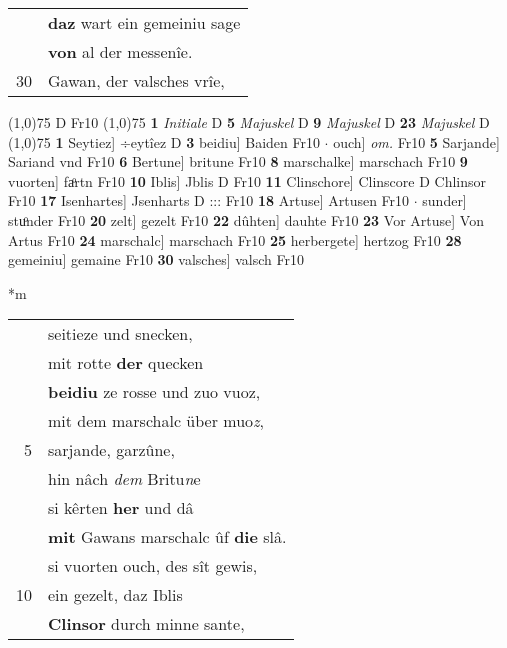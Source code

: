 \documentclass[8pt,a4paper,notitlepage]{article}
\begin{document}
\begin{table}[ht]
\begin{minipage}[t]{0.5\linewidth}
\begin{tabular}{rl}
 & \textbf{daz} wart ein gemeiniu sage\\ 
 & \textbf{von} al der messenîe.\\ 
30 & Gawan, der valsches vrîe,\\ 
\end{tabular}
\scriptsize
\line(1,0){75} \newline
D Fr10 \newline
\line(1,0){75} \newline
\textbf{1} \textit{Initiale} D  \textbf{5} \textit{Majuskel} D  \textbf{9} \textit{Majuskel} D  \textbf{23} \textit{Majuskel} D  \newline
\line(1,0){75} \newline
\textbf{1} Seytiez] ÷eytîez D \textbf{3} beidiu] Baiden Fr10  $\cdot$ ouch] \textit{om.} Fr10 \textbf{5} Sarjande] Sariand vnd Fr10 \textbf{6} Bertune] britune Fr10 \textbf{8} marschalke] marschach Fr10 \textbf{9} vuorten] faͦrtn Fr10 \textbf{10} Iblis] Jblis D Fr10 \textbf{11} Clinschore] Clinscore D Chlinsor Fr10 \textbf{17} Isenhartes] Jsenharts D ::: Fr10 \textbf{18} Artuse] Artusen Fr10  $\cdot$ sunder] stuͦnder Fr10 \textbf{20} zelt] gezelt Fr10 \textbf{22} dûhten] dauhte Fr10 \textbf{23} Vor Artuse] Von Artus Fr10 \textbf{24} marschalc] marschach Fr10 \textbf{25} herbergete] hertzog Fr10 \textbf{28} gemeiniu] gemaine Fr10 \textbf{30} valsches] valsch Fr10 \newline
\end{minipage}
\hspace{0.5cm}
\begin{minipage}[t]{0.5\linewidth}
\small
\begin{center}*m
\end{center}
\begin{tabular}{rl}
 & seitieze und snecken,\\ 
 & mit rotte \textbf{der} quecken\\ 
 & \textbf{beidiu} ze rosse und zuo vuoz,\\ 
 & mit dem marschalc über muo\textit{z},\\ 
5 & sarjande, garzûne,\\ 
 & hin nâch \textit{dem} Britu\textit{n}e\\ 
 & si kêrten \textbf{her} und dâ\\ 
 & \textbf{mit} Gawans marschalc ûf \textbf{die} slâ.\\ 
 & si vuorten ouch, des sît gewis,\\ 
10 & ein gezelt, daz Iblis\\ 
 & \textbf{Clinsor} durch minne sante,\\ 

\end{tabular}
\end{minipage}
\end{table}
\end{document}
